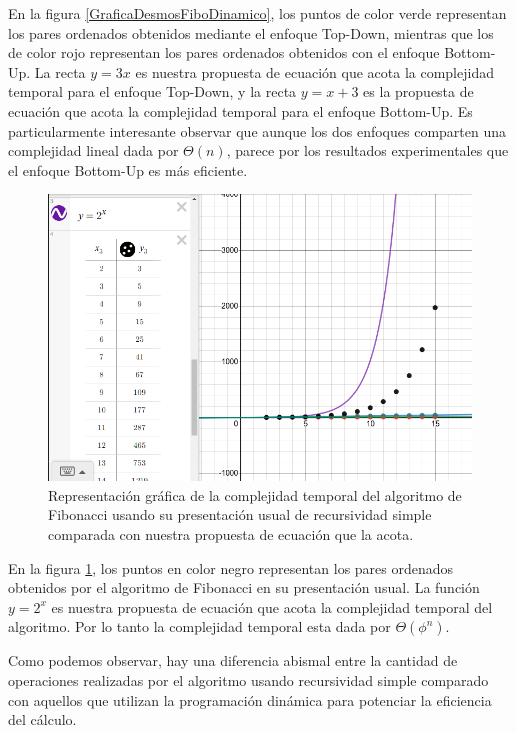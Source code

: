     En la figura \ref{GraficaDesmosFiboDinamico}, los puntos de color verde representan los pares ordenados obtenidos mediante el enfoque Top-Down, mientras que los de color rojo representan los pares ordenados obtenidos con el enfoque Bottom-Up. La recta $y=3x$ es nuestra propuesta de ecuación que acota la complejidad temporal para el enfoque Top-Down, y la recta $y=x+3$ es la propuesta de ecuación que acota la complejidad temporal para el enfoque Bottom-Up. Es particularmente interesante observar que aunque los dos enfoques comparten una complejidad lineal dada por $\Theta(n)$, parece por los resultados experimentales que el enfoque Bottom-Up es más eficiente.
    
    \newpage
    
    \begin{figure}[h!]
        \centering
        \includegraphics[width=18cm]{Fibonacci/graph-fibo-desm2.png}
        \caption{Representación gráfica de la complejidad temporal del algoritmo de Fibonacci usando su presentación usual de recursividad simple comparada con nuestra propuesta de ecuación que la acota.}
        \label{GraficaDesmosFiboRecu}
    \end{figure}
    
    En la figura \ref{GraficaDesmosFiboRecu}, los puntos en color negro representan los pares ordenados obtenidos por el algoritmo de Fibonacci en su presentación usual. La función $y=2^{x}$ es nuestra propuesta de ecuación que acota la complejidad temporal del algoritmo. Por lo tanto la complejidad temporal esta dada por $\Theta(\phi^{n})$.
    
    Como podemos observar, hay una diferencia abismal entre la cantidad de operaciones realizadas por el algoritmo usando recursividad simple comparado con aquellos que utilizan la programación dinámica para potenciar la eficiencia del cálculo.

